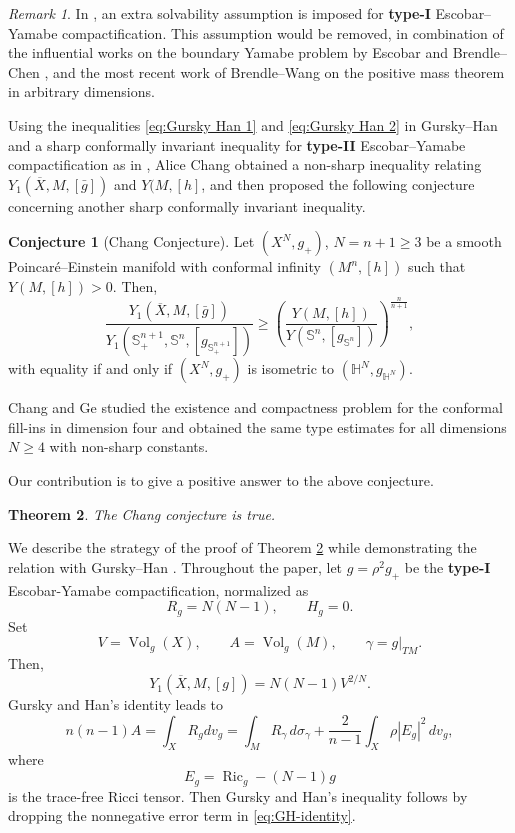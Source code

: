 \documentclass[11pt,letterpaper]{amsart}
\newtheorem{theorem}{Theorem}[section]
\theoremstyle{definition}
\newtheorem*{conjecture}{Conjecture}
\theoremstyle{remark}
\newtheorem{remark}[theorem]{Remark}
\numberwithin{equation}{section}
\newcommand{\Sph}{\mathbb S}
\newcommand{\vol}{\operatorname{Vol}}
\newcommand{\Ric}{\operatorname{Ric}}
\newcommand{\barX}{\overline X}
\begin{document}
\begin{remark}\label{rmk:main}
In \cite{GurskyHan}, an extra solvability assumption is imposed for
\textbf{type-I} Escobar--Yamabe compactification. This assumption would be 
removed, in combination of  the influential works on  the boundary Yamabe problem by Escobar \cite{Escobar}  and  Brendle--Chen
\cite{BrendleChen}, and the most recent work of Brendle--Wang \cite{BrendleWang} on the positive mass theorem in arbitrary dimensions.
\end{remark}

Using the inequalities \eqref{eq:Gursky Han 1} and
\eqref{eq:Gursky Han 2} in Gursky--Han \cite{GurskyHan} and
a sharp conformally invariant inequality for \textbf{type-II}
Escobar--Yamabe compactification as in
\cite{ChenLaiWang,WangWang}, Alice Chang obtained a non-sharp inequality relating $Y_1(\barX,M,[\bar g])$ and $Y(M,[h]$, and then proposed the following conjecture concerning another sharp conformally invariant inequality.
\begin{conjecture}[Chang Conjecture]
Let $(X^N,g_+)$, $N=n+1\ge 3$ be a smooth Poincar\'e--Einstein manifold with conformal infinity $(M^n,[h])$ such that $Y(M,[h])>0$. Then,
\begin{equation}\label{eq:main-conjecture}
\frac{Y_1(\barX,M,[\bar g])}{Y_1(\Sph^{n+1}_+,\Sph^n,[g_{\Sph_+^{n+1}}])}
 \ge
 \left(\frac{Y(M,[h])}{Y(\Sph^n,[g_{\Sph^n}])}\right)^{\frac{n}{n+1}},
\end{equation}    
with equality if and only if $\left(X^{N}, g_{+}\right)$ is isometric to $\left(\mathbb{H}^N, g_{\mathbb{H}^N}\right)$. 
\end{conjecture}
Chang and Ge \cite{ChangGefilling} studied the existence and compactness problem for the conformal fill-ins in dimension four and obtained the same type estimates for all dimensions $N \geq 4$ with non-sharp constants. 

Our contribution is to give a positive answer to the above conjecture.
\begin{theorem}\label{thm:main}
The Chang conjecture is true.
\end{theorem}



We describe the strategy of the proof of Theorem \ref{thm:main} while demonstrating the relation with Gursky--Han \cite{GurskyHan}.  Throughout the paper, let $g=\rho^2g_+$ be the \textbf{type-I} Escobar-Yamabe compactification, normalized as
\[
  R_g=N(N-1),\qquad H_g=0.
\]
Set
\[
  V=\vol_g(X),\qquad A=\vol_g(M),\qquad \gamma=g|_{TM}.
\]
Then,
\[
  Y_1(\barX,M,[g])=N(N-1)V^{2/N}.
\]
Gursky and Han's identity \cite[(2.15)]{GurskyHan} leads to
\begin{equation}\label{eq:GH-identity}
 n(n-1)A =\int_X R_g dv_g=\int_M R_\gamma\,d\sigma_\gamma+\frac{2}{n-1}\int_X\rho |E_g|^2\,dv_g,
\end{equation}
where
\[E_g=\Ric_g-(N-1)g\]
is the trace-free Ricci tensor.  Then Gursky and Han's inequality follows by dropping the nonnegative error term in \eqref{eq:GH-identity}.  
\end{document}
